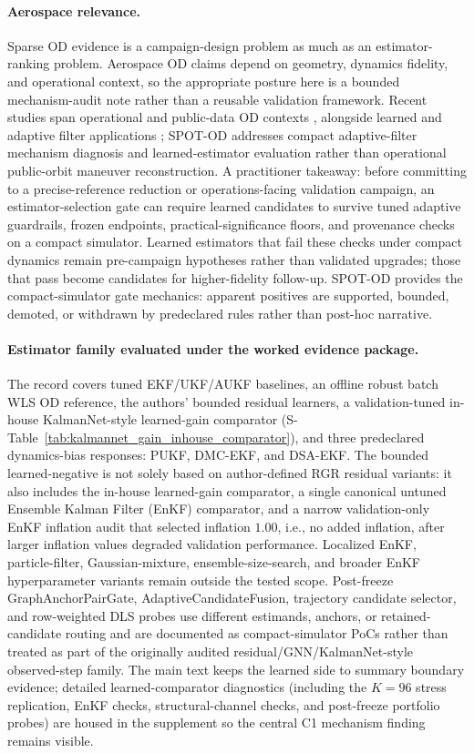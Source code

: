 \documentclass{article}
\begin{document}
\paragraph{Aerospace relevance.}
Sparse OD evidence is a campaign-design problem as much as an estimator-ranking problem. Aerospace OD claims depend on geometry, dynamics fidelity, and operational context, so the appropriate posture here is a bounded mechanism-audit note rather than a reusable validation framework. Recent studies span operational and public-data OD contexts \cite{ceresoli2025robust,oliveira2026opticalflow,liu2026epsa,lowe2026drag,lim2026publicorbitmaneuver}, alongside learned and adaptive filter applications \cite{zhang2026hnn}; SPOT-OD addresses compact adaptive-filter mechanism diagnosis and learned-estimator evaluation rather than operational public-orbit maneuver reconstruction. A practitioner takeaway: before committing to a precise-reference reduction or operations-facing validation campaign, an estimator-selection gate can require learned candidates to survive tuned adaptive guardrails, frozen endpoints, practical-significance floors, and provenance checks on a compact simulator. Learned estimators that fail these checks under compact dynamics remain pre-campaign hypotheses rather than validated upgrades; those that pass become candidates for higher-fidelity follow-up. SPOT-OD provides the compact-simulator gate mechanics: apparent positives are supported, bounded, demoted, or withdrawn by predeclared rules rather than post-hoc narrative.

\paragraph{Estimator family evaluated under the worked evidence package.}
The record covers tuned EKF/UKF/AUKF baselines, an offline robust batch WLS OD reference, the authors' bounded residual learners, a validation-tuned in-house KalmanNet-style learned-gain comparator (S-Table~\ref{tab:kalmannet_gain_inhouse_comparator}), and three predeclared dynamics-bias responses: PUKF, DMC-EKF, and DSA-EKF. The bounded learned-negative is not solely based on author-defined RGR residual variants: it also includes the in-house learned-gain comparator, a single canonical untuned Ensemble Kalman Filter (EnKF) comparator, and a narrow validation-only EnKF inflation audit that selected inflation \(1.00\), i.e., no added inflation, after larger inflation values degraded validation performance. Localized EnKF, particle-filter, Gaussian-mixture, ensemble-size-search, and broader EnKF hyperparameter variants remain outside the tested scope. Post-freeze GraphAnchorPairGate, AdaptiveCandidateFusion, trajectory candidate selector, and row-weighted DLS probes use different estimands, anchors, or retained-candidate routing and are documented as compact-simulator PoCs rather than treated as part of the originally audited residual/GNN/KalmanNet-style observed-step family. The main text keeps the learned side to summary boundary evidence; detailed learned-comparator diagnostics (including the $K=96$ stress replication, EnKF checks, structural-channel checks, and post-freeze portfolio probes) are housed in the supplement so the central C1 mechanism finding remains visible.
\end{document}
